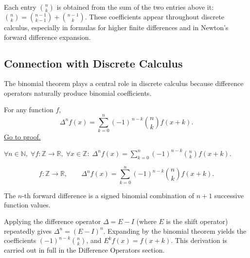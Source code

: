\begin{center}

\end{center}

\begin{remark*}[Interpretation]
Each entry \(\binom{n}{k}\) is obtained from the sum of the two entries
above it: \(\binom{n}{k}=\binom{n-1}{k-1}+\binom{n-1}{k}\).
These coefficients appear throughout discrete calculus, especially in
formulas for higher finite differences and in Newton's forward difference
expansion.
\end{remark*}

\subsection*{Connection with Discrete Calculus}

\begin{remark*}[Interpretation]
The binomial theorem plays a central role in discrete calculus because
difference operators naturally produce binomial coefficients.
\end{remark*}

\begin{proposition}
\label{prop:higher-diff-formula}
For any function \(f\),
\[
\Delta^n f(x)
=
\sum_{k=0}^{n} (-1)^{\,n-k}
\binom{n}{k}
f(x+k).
\]
\hyperref[prf:higher-diff-formula]{Go to proof.}
\end{proposition}

\begin{remark*}
\(\forall n \in \mathbb{N},\; \forall f : \mathbb{Z}\to\mathbb{R},\; \forall x \in \mathbb{Z}:\;
\Delta^n f(x) = \displaystyle\sum_{k=0}^{n}(-1)^{n-k}\binom{n}{k}f(x+k)\).
\end{remark*}

\begin{remark*}
\[
  f\colon\mathbb{Z}\to\mathbb{R},\qquad
  \Delta^n f(x)=\sum_{k=0}^{n}(-1)^{n-k}\binom{n}{k}f(x+k).
\]
\end{remark*}

\begin{remark*}[Interpretation]
The \(n\)-th forward difference is a signed binomial combination of \(n+1\)
successive function values.


Applying the difference operator \(\Delta = E - I\) (where \(E\) is the shift
operator) repeatedly gives \(\Delta^n = (E-I)^n\). Expanding by the binomial
theorem yields the coefficients \((-1)^{n-k}\binom{n}{k}\), and \(E^k f(x) = f(x+k)\).
This derivation is carried out in full in the Difference Operators section.
\end{remark*}

